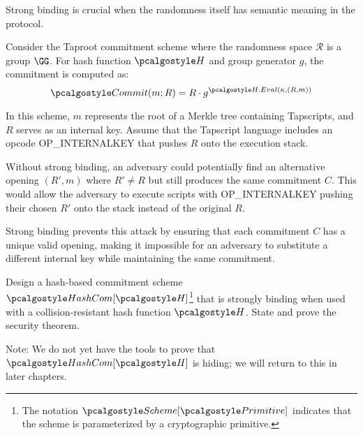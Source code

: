 \ifsolutions
\begin{mysolution}
  Strong binding is crucial when the randomness itself has semantic meaning in the protocol.

  Consider the Taproot commitment scheme where the randomness space $\mathcal{R}$ is a group $\GG$.
  For hash function $\algo{H}$ and group generator $g$, the commitment is computed as:
  \[
    \algo{Commit}(m; R) = R \cdot g^{\algo{H.Eval}(\kappa, (R, m))}
  \]

  In this scheme, $m$ represents the root of a Merkle tree containing Tapscripts, and $R$ serves as an internal key.
  Assume that the Tapscript language includes an opcode OP\_INTERNALKEY that pushes $R$ onto the execution stack.

  Without strong binding, an adversary could potentially find an alternative opening $(R', m)$ where $R' \neq R$ but still produces the same commitment $C$.
  This would allow the adversary to execute scripts with OP\_INTERNALKEY pushing their chosen $R'$ onto the stack instead of the original $R$.

  Strong binding prevents this attack by ensuring that each commitment $C$ has a unique valid opening, making it impossible for an adversary to substitute a different internal key while maintaining the same commitment.
\end{mysolution}
\fi

\begin{exercise}
  Design a hash-based commitment scheme $\algo{HashCom}[\algo{H}]$\footnote{The notation $\algo{Scheme}[\algo{Primitive}]$ indicates that the scheme is parameterized by a cryptographic primitive.} that is strongly binding when used with a collision-resistant hash function $\algo{H}$.
  State and prove the security theorem.
  
  Note: We do not yet have the tools to prove that $\algo{HashCom}[\algo{H}]$ is hiding; we will return to this in later chapters.
\end{exercise}

